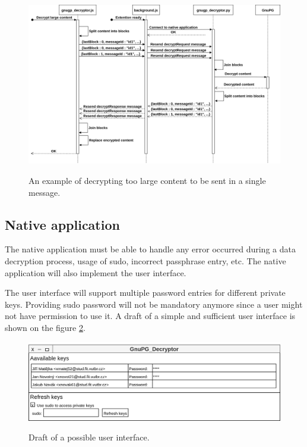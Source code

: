 \begin{figure}[H]
    \begin{center}
        \label{img:messageDraft}
        \includegraphics[width=1.3\textwidth,angle=90]{obrazky-figures/sequence-messageDesign.png}
        \caption{An example of decrypting too large content to be sent in a single message.}
    \end{center}
\end{figure}


\subsection{Native application}
The native application must be able to handle any error occurred during a data decryption process, usage of sudo, incorrect passphrase entry, etc. The native application will also implement the user interface.

The user interface will support multiple password entries for different private keys. Providing sudo password will not be mandatory anymore since a user might not have permission to use it. A draft of a simple and sufficient user interface is shown on the figure \ref{img:userInterfaceDesign}.

\begin{figure}[H]
    \begin{center}
        \label{img:userInterfaceDesign}
        \includegraphics[width=1.0\textwidth]{obrazky-figures/UI-design.png}
        \caption{Draft of a possible user interface.}
    \end{center}
\end{figure}

